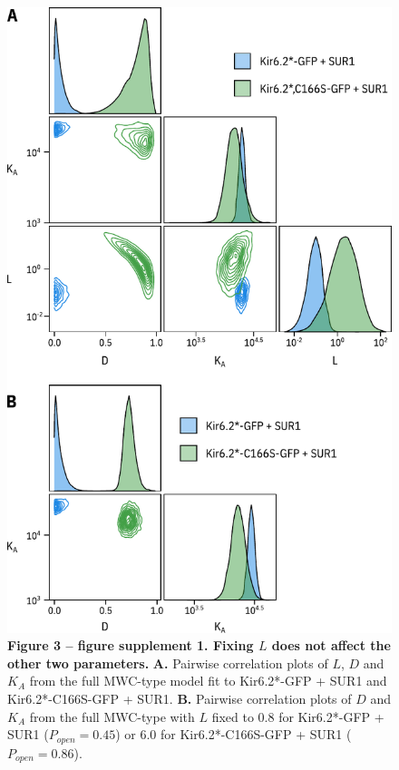 \documentclass[9pt,lineno, onehalfspacing]{elife_modified}
\begin{document}
\begin{figure}
\begin{fullwidth}
\includegraphics[height=0.95\textheight]{figure_three_s1}
\captionsetup{labelformat=empty}
\caption{
\textbf{Figure 3 -- figure supplement 1. Fixing $L$ does not affect the other two parameters.}
\textbf{A.}
Pairwise correlation plots of $L$, $D$ and $K_A$ from the full MWC-type model fit to Kir6.2*-GFP + SUR1 and Kir6.2*-C166S-GFP + SUR1.
\textbf{B.}
Pairwise correlation plots of $D$ and $K_A$ from the full MWC-type with $L$ fixed to 0.8 for Kir6.2*-GFP + SUR1 ($P_{open} = 0.45$) or 6.0 for Kir6.2*-C166S-GFP + SUR1 ($P_{open} = 0.86$).
}
\label{fig:three_s1}
\end{fullwidth}
\end{figure}
\end{document}
